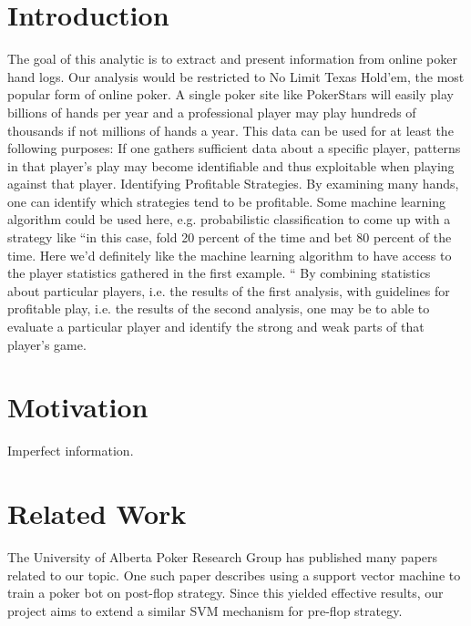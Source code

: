 \documentclass[twoside]{article}
\begin{document}
\begin{multicols}{2} %

\section{Introduction} 
The goal of this analytic is to extract and present information from online poker hand logs. Our analysis would be restricted to No Limit Texas Hold'em, the most popular form of online poker. A single poker site like PokerStars will easily play billions of hands per year and a professional player may play hundreds of thousands if not millions of hands a year. This data can be used for at least the following purposes:
If one gathers sufficient data about a specific player, patterns in that player's play may become identifiable and thus exploitable when playing against that player.
Identifying Profitable Strategies. By examining many hands, one can identify which strategies tend to be profitable. Some machine learning algorithm could be used here, e.g. probabilistic classification to come up with a strategy like ``in this case, fold 20 percent of the time and bet 80 percent of the time. Here we'd definitely like the machine learning algorithm to have access to the player statistics gathered in the first example. ``
By combining statistics about particular players, i.e. the results of the first analysis, with guidelines for profitable play, i.e. the results of the second analysis, one may be to able to evaluate a particular player and identify the strong and weak parts of that player's game.



\section{Motivation}

Imperfect information.


\section{Related Work}

The University of Alberta Poker Research Group has published many papers related to our topic.
One such paper describes using a support vector machine to train a poker bot on post-flop strategy. Since this yielded effective results, our project aims to extend a similar SVM mechanism for pre-flop strategy. 


\end{multicols}
\end{document}
